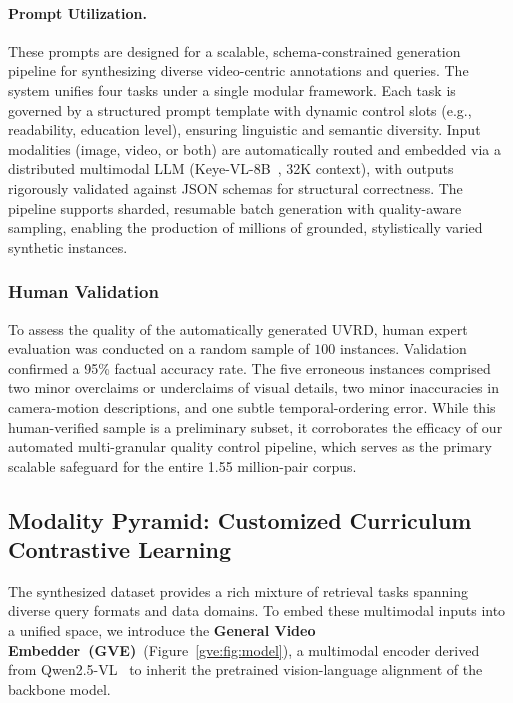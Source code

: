 \paragraph{Prompt Utilization.}
These prompts are designed for a scalable, schema-constrained generation pipeline for synthesizing diverse video-centric annotations and queries. The system unifies four tasks under a single modular framework.
Each task is governed by a structured prompt template with dynamic control slots (e.g., readability, education level), ensuring linguistic and semantic diversity. Input modalities (image, video, or both) are automatically routed and embedded via a distributed multimodal LLM (Keye-VL-8B~\cite{team2025kwai}, 32K context), with outputs rigorously validated against JSON schemas for structural correctness.
The pipeline supports sharded, resumable batch generation with quality-aware sampling, enabling the production of millions of grounded, stylistically varied synthetic instances.

\subsubsection{Human Validation}
To assess the quality of the automatically generated UVRD, human expert evaluation was conducted on a random sample of $100$ instances. Validation confirmed a 95\% factual accuracy rate. The five erroneous instances comprised two minor overclaims or underclaims of visual details, two minor inaccuracies in camera-motion descriptions, and one subtle temporal-ordering error. While this human-verified sample is a preliminary subset, it corroborates the efficacy of our automated multi-granular quality control pipeline, which serves as the primary scalable safeguard for the entire 1.55 million-pair corpus.


\subsection{Modality Pyramid: Customized Curriculum Contrastive Learning}
\label{gve:sec:modality_pyramid}

The synthesized dataset provides a rich mixture of retrieval tasks spanning diverse query formats and data domains. To embed these multimodal inputs into a unified space, we introduce the \textbf{General Video Embedder~(GVE)}~(Figure~\ref{gve:fig:model}), a multimodal encoder derived from Qwen2.5-VL~\cite{bai2025qwen25vl} to inherit the pretrained vision-language alignment of the backbone model.

